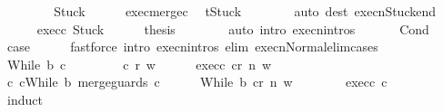 \begin{isabellebody}
\ \ \isamarkupfalse%
\isanewline
\ \ \ \ \isamarkupfalse%
\ Stuck\isanewline
\ \ \ \ \isamarkupfalse%
\ exec{\isacharunderscore}merge{\isacharunderscore}c{}\ \isamarkupfalse%
\ {\isachardoublequoteopen}t{\isacharequal}Stuck{\isachardoublequoteclose}\isanewline
\ \ \ \ \ \ \isamarkupfalse%
\ {\isacharparenleft}auto\ dest{\isacharcolon}\ execn{\isacharunderscore}Stuck{\isacharunderscore}end{\isacharparenright}\isanewline
\ \ \ \ \isamarkupfalse%
\ exec{\isacharunderscore}c{}\ Stuck\isanewline
\ \ \ \ \isamarkupfalse%
\ {\isacharquery}thesis\isanewline
\ \ \ \ \ \ \isamarkupfalse%
\ {\isacharparenleft}auto\ intro{\isacharcolon}\ execn{\isachardot}intros{\isacharparenright}\isanewline
\ \ \isamarkupfalse%
\isanewline
{}\isamarkupfalse%
\isanewline
\ \ \isamarkupfalse%
\ Cond\ \isamarkupfalse%
\ {\isacharquery}case\isanewline
\ \ \ \ \isamarkupfalse%
\ {\isacharparenleft}fastforce\ intro{\isacharcolon}\ execn{\isachardot}intros\ elim{\isacharcolon}\ execn{\isacharunderscore}Normal{\isacharunderscore}elim{\isacharunderscore}cases{\isacharparenright}\isanewline
{}\isamarkupfalse%
\isanewline
\ \ \isamarkupfalse%
\ {\isacharparenleft}While\ b\ c{\isacharparenright}\isanewline
\ \ \isacommand{{\isacharbraceleft}}\isamarkupfalse%
\isanewline
\ \ \ \ \isamarkupfalse%
\ c{\isacharprime}\ r\ w\isanewline
\ \ \ \ \isamarkupfalse%
\ exec{\isacharunderscore}c{\isacharprime}{\isacharcolon}\ {\isachardoublequoteopen}{\isasymGamma}{\isasymturnstile}{\isasymlangle}c{\isacharprime}{\isacharcomma}r{\isasymrangle}\ {\isacharequal}n{\isasymRightarrow}\ w{\isachardoublequoteclose}\isanewline
\ \ \ \ \isamarkupfalse%
\ c{\isacharprime}{\isacharcolon}\ {\isachardoublequoteopen}c{\isacharprime}{\isacharequal}While\ b\ {\isacharparenleft}merge{\isacharunderscore}guards\ c{\isacharparenright}{\isachardoublequoteclose}\isanewline
\ \ \ \ \isamarkupfalse%
\ {\isachardoublequoteopen}{\isasymGamma}{\isasymturnstile}{\isasymlangle}While\ b\ c{\isacharcomma}r{\isasymrangle}\ {\isacharequal}n{\isasymRightarrow}\ w{\isachardoublequoteclose}\isanewline
\ \ \ \ \ \ \isamarkupfalse%
\ exec{\isacharunderscore}c{\isacharprime}\ c{\isacharprime}\ \isanewline
\ \ \ \ \isamarkupfalse%
\ {\isacharparenleft}induct{\isacharparenright}\isanewline

\end{isabellebody}
